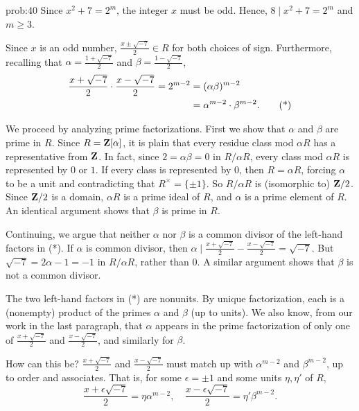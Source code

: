 \begin{sol}{prob:40} Since $x^2+7=2^m$, the integer $x$ must be odd. Hence, $8\mid x^2+7 = 2^m$ and $m\ge 3$. 

Since $x$ is an odd number, $\frac{x\pm \sqrt{-7}}{2} \in R$ for both choices of sign. Furthermore, recalling that $\alpha = \frac{1+\sqrt{-7}}{2}$ and $\beta = \frac{1-\sqrt{-7}}{2}$,
\begin{align}\notag \frac{x+ \sqrt{-7}}{2} \cdot \frac{x- \sqrt{-7}}{2} = 2^{m-2} &= (\alpha\beta)^{m-2}\\
&= \alpha^{m-2} \cdot \beta^{m-2}.\tag{*}
\end{align}

We proceed by analyzing prime factorizations. First we show that $\alpha$ and $\beta$ are prime in $R$. Since $R = \mathbf{Z}[\alpha]$, it is plain that every residue class mod $\alpha R$ has a representative from $\mathbf{Z}$. In fact, since $2 = \alpha\beta = 0$ in $R/\alpha R$, every class mod $\alpha R$ is represented by $0$ or $1$. If every class is represented by $0$, then $R = \alpha R$, forcing $\alpha$ to be a unit and contradicting that $R^{\times} = \{\pm 1\}$. So $R/\alpha R$ is (isomorphic to) $\mathbf{Z}/2$. Since $\mathbf{Z}/2$ is a domain, $\alpha R$ is a prime ideal of $R$, and $\alpha$ is a prime element of $R$. An identical argument shows that $\beta$ is prime in $R$.


Continuing, we argue that neither $\alpha$ nor $\beta$ is a common divisor of the left-hand factors in (*). If $\alpha$ is common divisor, then $\alpha \mid \frac{x+\sqrt{-7}}{2} - \frac{x-\sqrt{-7}}{2} = \sqrt{-7}$. But $\sqrt{-7} = 2\alpha-1 = -1$ in $R/\alpha R$, rather than $0$. A similar argument shows that $\beta$ is not a common divisor.

The two left-hand factors in (*) are nonunits. By unique factorization, each is a (nonempty) product of the primes $\alpha$ and $\beta$ (up to units). We also know, from our work in the last paragraph, that $\alpha$ appears in the prime factorization of only one of $\frac{x+ \sqrt{-7}}{2}$ and $\frac{x- \sqrt{-7}}{2}$, and similarly for $\beta$.

How can this be? $\frac{x+ \sqrt{-7}}{2}$ and $\frac{x-\sqrt{-7}}{2}$ must match up with $\alpha^{m-2}$ and $\beta^{m-2}$, up to order and associates. That is, for some $\epsilon = \pm 1$ and some units $\eta, \eta'$ of $R$,
\[ \frac{x+\epsilon \sqrt{-7}}{2} =  \eta \alpha^{m-2}, \quad \frac{x-\epsilon \sqrt{-7}}{2} =  \eta' \beta^{m-2}.\]


\end{sol}
